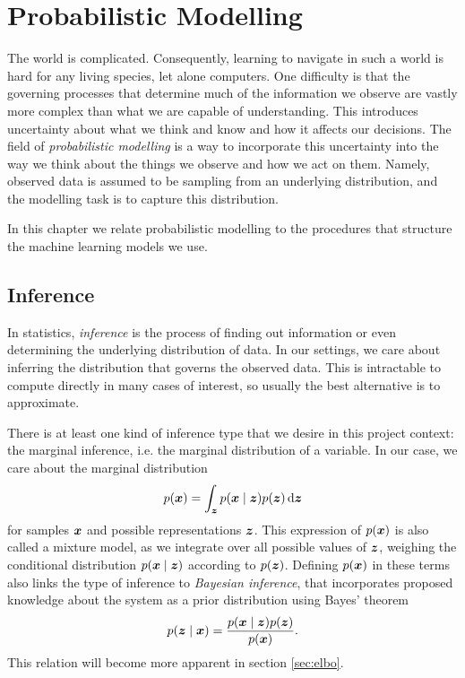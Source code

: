 \chapter{Probabilistic Modelling}
\label{chapter:probabilistic_modelling}

The world is complicated. Consequently, learning to navigate in such a world is hard for any living species, let alone computers. One difficulty is that the governing processes that determine much of the information we observe are vastly more complex than what we are capable of understanding. This introduces uncertainty about what we think and know and how it affects our decisions. The field of \textit{probabilistic modelling} is a way to incorporate this uncertainty into the way we think about the things we observe and how we act on them. Namely, observed data is assumed to be sampling from an underlying distribution, and the modelling task is to capture this distribution.

In this chapter we relate probabilistic modelling to the procedures that structure the machine learning models we use.

\section{Inference}
In statistics, \textit{inference} is the process of finding out information or even determining the underlying distribution of data. In our settings, we care about inferring the distribution that governs the observed data. This is intractable to compute directly in many cases of interest, so usually the best alternative is to approximate.

There is at least one kind of inference type that we desire in this project context: the marginal inference, i.e. the marginal distribution of a variable. In our case, we care about the marginal distribution 
\begin{equation}
    p(\bm{ x }) = \int_{\bm{ z }} p(\bm{ x } \mid \bm{ z }) p(\bm{ z }) \mathop{}\!\mathrm{d} \bm{ z } \label{eq:marginal_distribution}
\end{equation}
for samples $\bm{ x }$ and possible representations $\bm{ z }$. This expression of $p(\bm{ x })$ is also called a mixture model, as we integrate over all possible values of $\bm{ z }$, weighing the conditional distribution $p(\bm{ x } \mid \bm{ z })$ according to $p(\bm{ z })$. Defining $p(\bm{ x })$ in these terms also links the type of inference to \textit{Bayesian inference}, that incorporates proposed knowledge about the system as a prior distribution using Bayes' theorem
\begin{equation}
    p(\bm{ z } \mid \bm{ x }) = \frac{p(\bm{ x } \mid \bm{ z }) p(\bm{ z })}{p(\bm{ x })}. \label{eq:bayes_theorem}
\end{equation}
This relation will become more apparent in section \ref{sec:elbo}.

